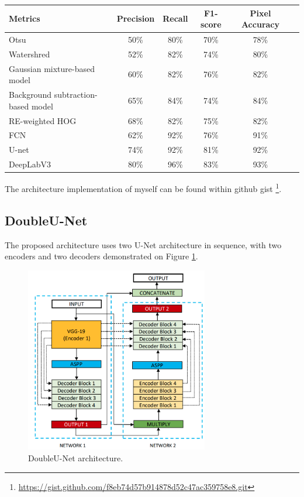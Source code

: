 \begin{table}[htbp]
\centering
\begin{tabular}{|l|c|c|c|c|c} \hline\hline
Metrics & Precision & Recall & F1-score & Pixel Accuracy\\ \hline
Otsu & 50\% & 80\% & 70\% & 78\%  \\
Watershred & 52\% & 82\% & 74\% & 80\% \\
Gaussian mixture-based model & 60\% & 82\% & 76\% & 82\%  \\
Background subtraction-based model & 65\% & 84\% & 74\% & 84\% \\
RE-weighted HOG & 68\% & 82\% & 75\% & 82\%  \\
FCN & 62\% & 92\% & 76\% & 91\%  \\
U-net & 74\% & 92\% & 81\% & 92\% \\
DeepLabV3 & 80\% & 96\% & 83\% & 93\% \\ 
\hline\hline
\end{tabular}
\end{table} 
 
The architecture implementation of myself can be found within github gist \footnote { \url{https://gist.github.com/f8eb74d57b914878d52c47ac359758e8.git}}. 



\subsection{DoubleU-Net}
The proposed architecture uses two U-Net architecture in sequence, with two encoders and two decoders demonstrated on Figure \ref{fig:double_unet}.

\begin{figure}[h]
    \centering \includegraphics[width=8cm]{images/DoubleU-Net.png}
    \caption {DoubleU-Net architecture.}
    \label{fig:double_unet}
\end{figure}

